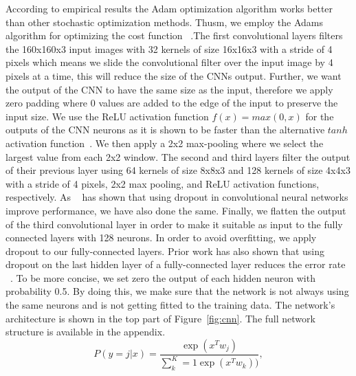 \documentclass{article} %
\begin{document}
According to empirical results the Adam optimization algorithm works better than other stochastic optimization methods. Thusm, we employ the Adams algorithm for optimizing the cost function ~\cite{adam}.The first convolutional layers filters the 160x160x3 input images with 32 kernels of size 16x16x3 with a stride of 4 pixels which means we slide the convolutional filter over the input image by 4 pixels at a time, this will reduce the size of the CNNs output. Further, we want the output of the CNN to have the same size as the input, therefore we apply zero padding where 0 values are added to the edge of the input to preserve the input size. We use the ReLU activation function $f(x) = max(0,x)$ for the outputs of the CNN neurons as it is shown to be faster than the alternative $tanh$ activation function~\cite{imagehinton}. We then apply a 2x2 max-pooling where we select the largest value from each 2x2 window. 
The second and third layers filter the output of their previous layer using 64 kernels of size 8x8x3 and 128 kernels of size 4x4x3 with a stride of 4 pixels, 2x2 max pooling, and ReLU activation functions, respectively. As ~\cite{cnndropout2} has shown that using dropout in convolutional neural networks improve performance, we have also done the same.
Finally, we flatten the output of the third convolutional layer in order to make it suitable as input to the fully connected layers with 128 neurons. In order to avoid overfitting, we apply dropout to our fully-connected layers. Prior work has also shown that using dropout on the last hidden layer of a fully-connected layer reduces the error rate ~\cite{cnndropout}. To be more concise, we set zero the output of each hidden neuron with probability 0.5. By doing this, we make sure that the network is not always using the same neurons and is not getting fitted to the training data. The network's architecture is shown in the top part of Figure~\ref{fig:cnn}. The full network structure is available in the appendix.
\begin{equation}
  \label{softmax}
  P(y=j | x) = \frac{\exp(x^T w_j)}{\sum^{K}_k=1 \exp(x^T w_k))},
\end{equation}
\end{document}
